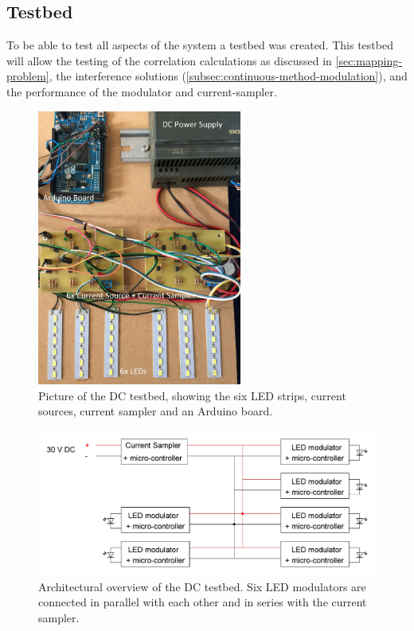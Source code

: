 
\subsection{Testbed}
	\label{subsec:dc-testbed}

	To be able to test all aspects of the system a testbed was created.
	This testbed will allow the testing of the correlation calculations as discussed in \autoref{sec:mapping-problem}, the interference solutions (\autoref{subsec:continuous-method-modulation}), and the performance of the modulator and current-sampler.


	\begin{figure}[ht]
		\centering
		\includegraphics[angle=0,width=0.6\textwidth,height=.9\textheight,keepaspectratio]{chapters/hardware-chapters/DC/dc-test-bed/dc-test-bed-picture.JPG}
		\caption{Picture of the DC testbed, showing the six LED strips, current sources, current sampler and an Arduino board.}
		\label{fig:dc-test-bed-picture}
	\end{figure}

	\begin{figure}[ht]
		\centering
		\includegraphics[angle=0,width=1.0\textwidth,keepaspectratio]{chapters/hardware-chapters/DC/dc-test-bed/dc-test-bed-architectural.JPG}
		\caption{Architectural overview of the DC testbed. Six LED modulators are connected in parallel with each other and in series with the current sampler.}
		\label{fig:dc-test-bed-architectural}
	\end{figure}


